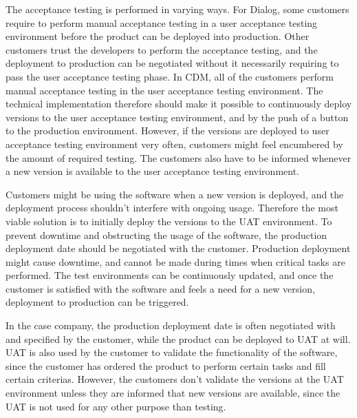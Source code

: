 \documentclass[english]{tktltiki2}
\theoremstyle{definition}
\theoremstyle{remark}
\begin{document}
The acceptance testing is performed in varying ways. For Dialog, some customers require to perform manual acceptance testing in a user acceptance testing environment before the product can be deployed into production. Other customers trust the developers to perform the acceptance testing, and the deployment to production can be negotiated without it necessarily requiring to pass the user acceptance testing phase. In CDM, all of the customers perform manual acceptance testing in the user acceptance testing environment. The technical implementation therefore should make it possible to continuously deploy versions to the user acceptance testing environment, and by the push of a button to the production environment. However, if the versions are deployed to user acceptance testing environment very often, customers might feel encumbered by the amount of required testing. The customers also have to be informed whenever a new version is available to the user acceptance testing environment.

Customers might be using the software when a new version is deployed, and the deployment process shouldn't interfere with ongoing usage. Therefore the most viable solution is to initially deploy the versions to the UAT environment. To prevent downtime and obstructing the usage of the software, the production deployment date should be negotiated with the customer. Production deployment might cause downtime, and cannot be made during times when critical tasks are performed. The test environments can be continuously updated, and once the customer is satisfied with the software and feels a need for a new version, deployment to production can be triggered.  

In the case company, the production deployment date is often negotiated with and specified by the customer, while the product can be deployed to UAT at will. UAT is also used by the customer to validate the functionality of the software, since the customer has ordered the product to perform certain tasks and fill certain criterias. However, the customers don't validate the versions at the UAT environment unless they are informed that new versions are available, since the UAT is not used for any other purpose than testing. 



\end{document}
